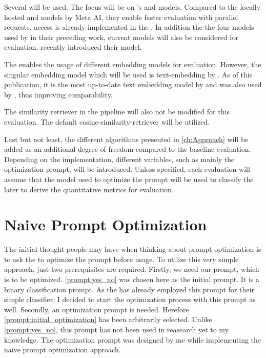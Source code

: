Several \LLMs will be used. 
The focus will be on \OAI's \gpt and \gptmini models. 
Compared to the locally hosted \codellama and \llama models by Meta AI, they enable faster evaluation with parallel requests.
\API access is already implemented in the \LiSSAf.
In addition the the four models used by  in their preceding work, current models will also be considered for evaluation.
\OAI recently introduced their \gptf model.

The \LiSSAf enables the usage of different embedding models for evaluation.
However, the singular embedding model which will be used is \ac{text-embedding} by \OAI.
As of this publication, it is the most up-to-date text embedding model by \OAI and was also used by \citeauthor{hey2025RequirementsTraceability}, thus improving comparability.

The similarity retriever in the \LiSSA pipeline will also not be modified for this evaluation.
The default cosine-similarity-retriever will be utilized.

Last but not least, the different \APE algorithms presented in \autoref{ch:Approach} will be added as an additional degree of freedom compared to the baseline evaluation.
Depending on the implementation, different variables, such as mainly the optimization prompt, will be introduced. 
Unless specified, each evaluation will assume that the model used to optimize the prompt will be used to classify the \TLs later to derive the quantitative metrics for evaluation.


\section{Naive Prompt Optimization}
\label{sec:Evaluation:naive_optimization}

The initial thought people may have when thinking about prompt optimization is to ask the \LLM to optimize the prompt before usage. To utilize this very simple approach, just two prerequisites are required. Firstly, we need our prompt, which is to be optimized. \autoref{prompt:yes_no} was chosen here as the initial prompt. It is a \KISS binary classification prompt. As the \LiSSAf has already employed this prompt for their simple classifier, I decided to start the optimization process with this prompt as well. Secondly, an optimization prompt is needed. Herefore \autoref{prompt:initial_optimization} has been arbitrarily selected. Unlike \autoref{prompt:yes_no}, this prompt has not been used in reasearch yet to my knowledge. 
The optimization prompt was designed by me while implementing the naive prompt optimization approach.


